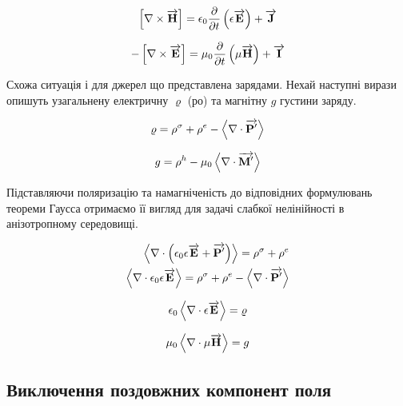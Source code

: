 \begin{equation} \label{eq:rotHfromE}
\left[ \nabla \times \overrightarrow{\mathbf H} \right] = 
\epsilon_0 \frac{\partial }{\partial t} \left( \epsilon \overrightarrow{\mathbf E} \right) + \overrightarrow{\mathbf J}
\end{equation}

\begin{equation} \label{eq:rotEfromH} 
- \left[ \nabla \times \overrightarrow{\mathbf E} \right] = 
\mu_0 \frac{\partial }{\partial t} \left( \mu \overrightarrow{\mathbf H} \right) + \overrightarrow{\mathbf I}
\end{equation}

Схожа ситуація і для джерел що представлена зарядами. Нехай наступні вирази
опишуть узагальнену електричну $ \varrho $ (ро) та магнітну $ g $ густини 
заряду.

\begin{equation*}
\varrho = \rho^\sigma + \rho^e - \left< \nabla \cdot \overrightarrow{\mathbf P^\prime} \right>
\end{equation*}

\begin{equation*}
g = \rho^h - \mu_0 \left< \nabla \cdot \overrightarrow{\mathbf M^\prime} \right>
\end{equation*}

Підставляючи поляризацію та намагніченість до відповідних формулювань теореми 
Гаусса отримаємо її вигляд для задачі слабкої нелінійності в анізотропному 
середовищі.

\textcolor{lightgray}{ \begin{equation*} \begin{aligned}
\left< \nabla \cdot  \left( \epsilon_0 \epsilon \overrightarrow{\mathbf E} + 
\overrightarrow{\mathbf P^\prime} \right)  \right> = \rho^\sigma + \rho^e \\
\left< \nabla \cdot  \epsilon_0 \epsilon \overrightarrow{\mathbf E}  \right> = \rho^\sigma + \rho^e -
\left< \nabla \cdot  \overrightarrow{\mathbf P^\prime}  \right>
\end{aligned} \end{equation*} }

\begin{equation} \label{eq:divE} 
\epsilon_0 \left< \nabla \cdot  \epsilon \overrightarrow{\mathbf E}  \right> = \varrho
\end{equation}

\begin{equation} \label{eq:divH}
\mu_0 \left< \nabla \cdot  \mu \overrightarrow{\mathbf H}  \right> = g
\end{equation}

\subsection{Виключення поздовжних компонент поля}

